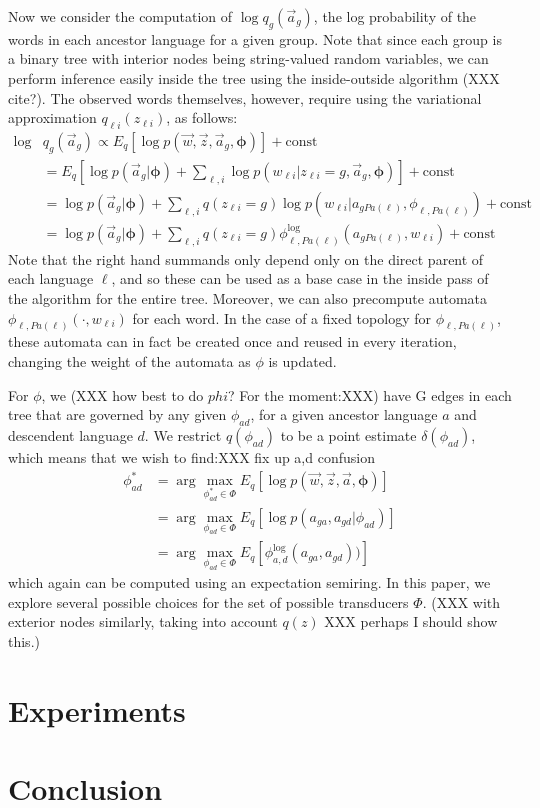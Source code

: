 \documentclass[11pt]{article}
\begin{document}
Now we consider the computation of $\log q_g(\vec a_g)$, the log
probability of the words in each ancestor language for a given
group. Note that since each group is a binary tree with interior
nodes being string-valued random variables, we can perform inference
easily inside the tree using the inside-outside algorithm (XXX
cite?). The observed words themselves, however, require using the
variational approximation $q_{\ell i}(z_{\ell i})$, as follows:
 \begin{equation}
   \begin{split}
     \log &q_{g}(\vec a_g) \propto E_q[\log p(\vec w, \vec z, \vec a_g,\mathbf{\phi})] + \mathrm{const}\\
     &= E_q[\log p(\vec a_g|\mathbf\phi) + \sum_{\ell,i}\log p(w_{\ell i}| z_{\ell i} = g, \vec a_g,\mathbf\phi)] + \mathrm{const}\\
     &= \log p(\vec a_g|\mathbf\phi) + \sum_{\ell,i} q(z_{\ell i}=g) \log p(w_{\ell i}|a_{g Pa(\ell)},\phi_{\ell,Pa(\ell)}) + \mathrm{const}\\
     &= \log p(\vec a_g|\mathbf\phi) + \sum_{\ell,i} q(z_{\ell i}=g) \phi_{\ell,Pa(\ell)}^{\log}(a_{g Pa(\ell)},w_{\ell i}) + \mathrm{const}
    \end{split}
  \end{equation}
Note that the right hand summands only depend only on the direct
parent of each language $\ell$, and so these can be used as a base
case in the inside pass of the algorithm for the entire tree.
Moreover, we can also precompute automata
$\phi_{\ell,Pa(\ell)}(\cdot,w_{\ell i})$ for each word. In the case
of a fixed topology for $\phi_{\ell,Pa(\ell)}$, these automata can
in fact be created once and reused in every iteration, changing
the weight of the automata as $\phi$ is updated.

For $\phi$, we (XXX how best to do $phi$? For the moment:XXX) have
G edges in each tree that are governed by any given $\phi_{ad}$,
for a given ancestor language $a$ and descendent language $d$. We
restrict $q(\phi_{ad})$ to be a point estimate $\delta(\phi_{ad})$,
which means that we wish to find:XXX fix up a,d confusion
\begin{equation}
  \begin{split}
    \phi_{ad}^* &= \arg\max_{\phi_{ad}^* \in \Phi} E_q[\log p(\vec w, \vec z, \vec a,\mathbf{\phi})] \\
    &= \arg\max_{\phi_{ad} \in \Phi} E_q[\log p(a_{ga},a_{gd}|\phi_{ad})]\\
    &= \arg\max_{\phi_{ad} \in \Phi} E_q[\phi^{\log}_{a,d}(a_{ga},a_{gd}))]
   \end{split}
 \end{equation}
which again can be computed using an expectation semiring. In this
paper, we explore several possible choices for the set of possible
transducers $\Phi$.
 (XXX with exterior nodes similarly, taking into account $q(z)$ XXX perhaps I should show this.)
\section{Experiments}
\section{Conclusion}
\end{document}
